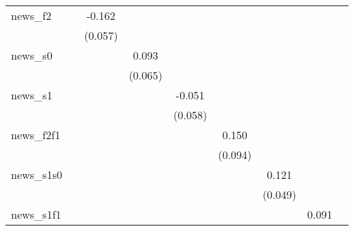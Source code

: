 {\begin{tabular}{l*{8}{c}}
news\_f2     &                     &      -0.162\sym{***}&                     &                     &                     &                     &                     &                     \\
            &                     &     (0.057)         &                     &                     &                     &                     &                     &                     \\
\addlinespace
news\_s0     &                     &                     &       0.093         &                     &                     &                     &                     &                     \\
            &                     &                     &     (0.065)         &                     &                     &                     &                     &                     \\
\addlinespace
news\_s1     &                     &                     &                     &      -0.051         &                     &                     &                     &                     \\
            &                     &                     &                     &     (0.058)         &                     &                     &                     &                     \\
\addlinespace
news\_f2f1   &                     &                     &                     &                     &       0.150         &                     &                     &                     \\
            &                     &                     &                     &                     &     (0.094)         &                     &                     &                     \\
\addlinespace
news\_s1s0   &                     &                     &                     &                     &                     &       0.121\sym{**} &                     &                     \\
            &                     &                     &                     &                     &                     &     (0.049)         &                     &                     \\
\addlinespace
news\_s1f1   &                     &                     &                     &                     &                     &                     &       0.091         &                     \\

\end{tabular}}
